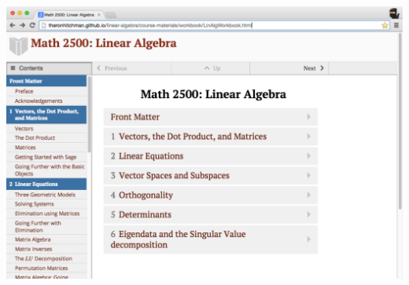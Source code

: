 \documentclass[final]{beamer}
\begin{document}
\begin{frame}{}
\begin{columns}[t]
\begin{column}{.31\linewidth}
        \begin{block}{}
          \centering
            \includegraphics[width=.6\linewidth]{laworkbook}
        \end{block}
      \end{column}
    \end{columns}




  \end{frame}
  
\end{document}
